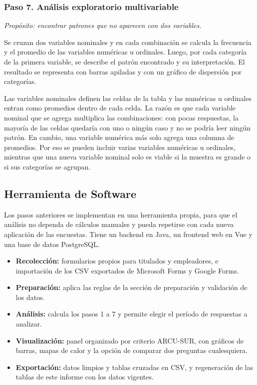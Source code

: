 \documentclass[12pt, a4paper]{article}
\begin{document}
\subsubsection{Paso 7. Análisis exploratorio multivariable}

\textit{Propósito: encontrar patrones que no aparecen con dos
variables.}

Se cruzan dos variables nominales y en cada combinación se calcula la
frecuencia y el promedio de las variables numéricas u ordinales. Luego,
por cada categoría de la primera variable, se describe el patrón
encontrado y su interpretación. El resultado se representa con barras
apiladas y con un gráfico de dispersión por categorías.

Las variables nominales definen las celdas de la tabla y las numéricas u
ordinales entran como promedios dentro de cada celda. La razón es que
cada variable nominal que se agrega multiplica las combinaciones: con
pocas respuestas, la mayoría de las celdas quedaría con uno o ningún caso
y no se podría leer ningún patrón. En cambio, una variable numérica más
solo agrega una columna de promedios. Por eso se pueden incluir varias
variables numéricas u ordinales, mientras que una nueva variable nominal
solo es viable si la muestra es grande o si sus categorías se agrupan.

\subsection{Herramienta de Software}

Los pasos anteriores se implementan en una herramienta propia, para que
el análisis no dependa de cálculos manuales y pueda repetirse con cada
nueva aplicación de las encuestas. Tiene un backend en Java, un
frontend web en Vue y una base de datos PostgreSQL.

\begin{itemize}
  \item \textbf{Recolección:} formularios propios para titulados y
  empleadores, e importación de los CSV exportados de Microsoft Forms y
  Google Forms.
  \item \textbf{Preparación:} aplica las reglas de la sección de
  preparación y validación de los datos.
  \item \textbf{Análisis:} calcula los pasos 1 a 7 y permite elegir el
  período de respuestas a analizar.
  \item \textbf{Visualización:} panel organizado por criterio ARCU-SUR,
  con gráficos de barras, mapas de calor y la opción de comparar dos
  preguntas cualesquiera.
  \item \textbf{Exportación:} datos limpios y tablas cruzadas en CSV, y
  regeneración de las tablas de este informe con los datos vigentes.
\end{itemize}
\end{document}
